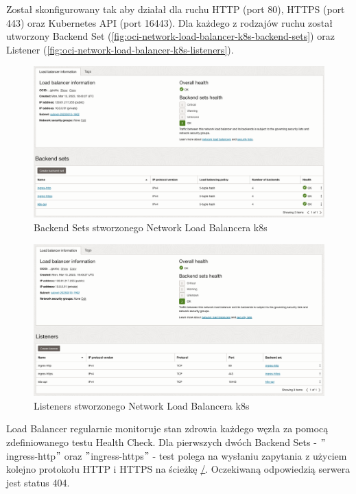 Został skonfigurowany tak aby działał dla ruchu HTTP (port 80), HTTPS (port 443) oraz Kubernetes API (port 16443).
Dla każdego z rodzajów ruchu został utworzony Backend Set (\autoref{fig:oci-network-load-balancer-k8s-backend-sets}) oraz Listener (\autoref{fig:oci-network-load-balancer-k8s-listeners}).

\begin{figure}[H]
    \centering
    \includegraphics[width=\textwidth]{img/oci-network-load-balancer-k8s-backend-sets}
    \caption{Backend Sets stworzonego Network Load Balancera k8s}
    \label{fig:oci-network-load-balancer-k8s-backend-sets}
\end{figure}

\begin{figure}[H]
    \centering
    \includegraphics[width=\textwidth]{img/oci-network-load-balancer-k8s-listeners}
    \caption{Listeners stworzonego Network Load Balancera k8s}
    \label{fig:oci-network-load-balancer-k8s-listeners}
\end{figure}

Load Balancer regularnie monitoruje stan zdrowia każdego węzła za pomocą zdefiniowanego testu Health Check.
Dla pierwszych dwóch Backend Sets - \("\)ingress-http\("\) oraz \("\)ingress-https\("\) - test polega na wysłaniu zapytania z użyciem kolejno protokołu HTTP i HTTPS na ścieżkę \url{/}.
Oczekiwaną odpowiedzią serwera jest status 404.

